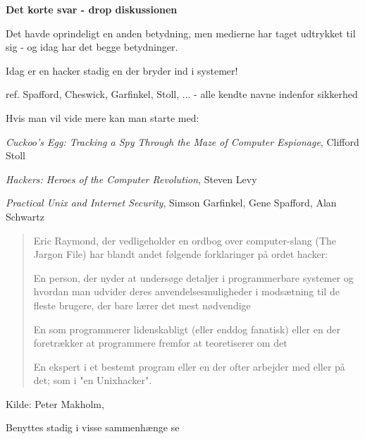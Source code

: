 \documentclass[20pt,landscape,a4paper,footrule]{foils}
\begin{document}

{\bfseries Det korte svar - drop diskussionen}

Det havde oprindeligt en anden betydning, men medierne har taget
udtrykket til sig - og idag har det begge betydninger. 

{\color{red}\hlkbig Idag er en hacker stadig en der bryder ind i systemer!}

ref. Spafford, Cheswick, Garfinkel, Stoll, ...
- alle kendte navne indenfor sikkerhed

Hvis man vil vide mere kan man starte med:
\begin{list2}
\item \emph{Cuckoo's Egg: Tracking a Spy Through the Maze of Computer
 Espionage},  Clifford Stoll  
\item \emph{Hackers: Heroes of the Computer Revolution},
Steven Levy
\item \emph{Practical Unix and Internet Security},
Simson Garfinkel, Gene Spafford, Alan Schwartz 
\end{list2}


\begin{quote}
Eric Raymond, der vedligeholder en ordbog over computer-slang (The Jargon File) har blandt andet følgende forklaringer på ordet hacker:
\begin{list2}
\item En person, der nyder at undersøge detaljer i programmerbare systemer og hvordan man udvider deres anvendelsesmuligheder i modsætning til de fleste brugere, der bare lærer det mest nødvendige
\item En som programmerer lidenskabligt (eller enddog fanatisk) eller en der foretrækker at programmere fremfor at teoretiserer om det
\item En ekspert i et bestemt program eller en der ofter arbejder med eller på det; som i "en Unixhacker".
\end{list2}
\end{quote}

\begin{list1}
\item Kilde: Peter Makholm, 
\item Benyttes stadig i visse sammenhænge se 
\end{list1}

\end{document}
